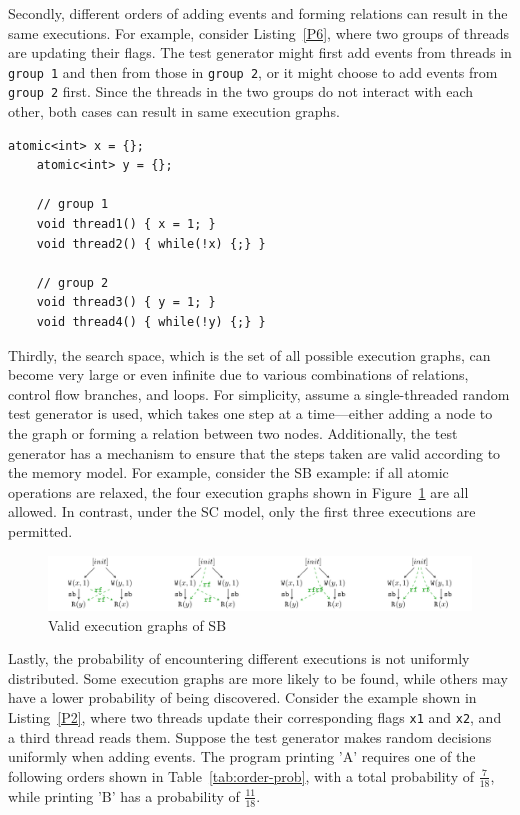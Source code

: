 Secondly, different orders of adding events and forming relations can result in the same executions. For example, consider Listing~\ref{P6}, where two groups of threads are updating their flags. The test generator might first add events from threads in \texttt{group 1} and then from those in \texttt{group 2}, or it might choose to add events from \texttt{group 2} first. Since the threads in the two groups do not interact with each other, both cases can result in same execution graphs.


\begin{lstlisting}[caption={P6}, label={P6}]
    atomic<int> x = {}; 
    atomic<int> y = {}; 
    
    // group 1
    void thread1() { x = 1; }
    void thread2() { while(!x) {;} }

    // group 2
    void thread3() { y = 1; }
    void thread4() { while(!y) {;} }

\end{lstlisting}


Thirdly, the search space, which is the set of all possible execution graphs, can become very large or even infinite due to various combinations of relations, control flow branches, and loops. For simplicity, assume a single-threaded random test generator is used, which takes one step at a time—either adding a node to the graph or forming a relation between two nodes. Additionally, the test generator has a mechanism to ensure that the steps taken are valid according to the memory model. For example, consider the SB example: if all atomic operations are relaxed, the four execution graphs shown in Figure~\ref{SB4} are all allowed. In contrast, under the SC model, only the first three executions are permitted.


\begin{figure}[h!tbp]  
    \centering
    \includegraphics[scale=0.8]{figure/exec-graph/SB4.pdf}   
    \caption{Valid execution graphs of SB}  
    \label{SB4}  
\end{figure}



Lastly, the probability of encountering different executions is not uniformly distributed. Some execution graphs are more likely to be found, while others may have a lower probability of being discovered. Consider the example shown in Listing~\ref{P2}, where two threads update their corresponding flags \texttt{x1} and \texttt{x2}, and a third thread reads them. Suppose the test generator makes random decisions uniformly when adding events. The program printing 'A' requires one of the following orders shown in Table~\ref{tab:order-prob}, with a total probability of $\frac{7}{18}$, while printing 'B' has a probability of $\frac{11}{18}$.



